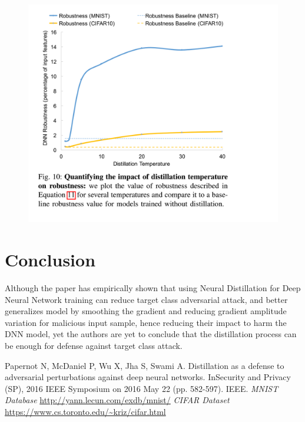 \documentclass[12pt]{article}
\begin{document}
\begin{figure}[H]
\begin{center}
\includegraphics[scale=.4]{robust}
\end{center}
\end{figure} 
\section*{Conclusion}
Although the paper has empirically shown that using Neural Distillation for Deep Neural Network training can reduce target class adversarial attack, and better generalizes model by smoothing the gradient and reducing gradient amplitude variation for malicious input sample, hence reducing their impact to harm the DNN model, yet the authors are yet to conclude that the distillation process can be enough for defense against target class attack.
\begin{thebibliography}{}
Papernot N, McDaniel P, Wu X, Jha S, Swami A. Distillation as a defense to adversarial perturbations against deep neural networks. InSecurity and Privacy (SP), 2016 IEEE Symposium on 2016 May 22 (pp. 582-597). IEEE.
\textit{MNIST Database} 
\url{http://yann.lecun.com/exdb/mnist/}
\textit{CIFAR Dataset} 
\url{https://www.cs.toronto.edu/~kriz/cifar.html}
\end{thebibliography}
\end{document}
